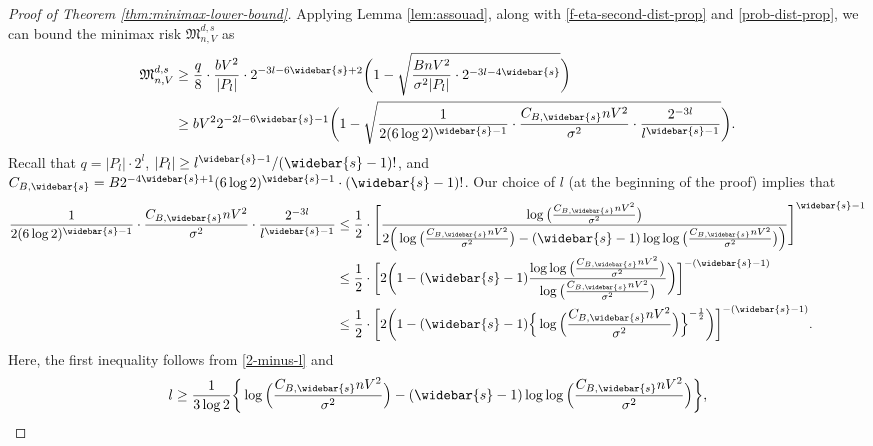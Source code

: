 \documentclass[10pt]{article}
\newcommand{\minimax}{{\mathfrak{M}^{d, s}_{n, V}}}
\begin{document}
\begin{proof}[Proof of Theorem \ref{thm:minimax-lower-bound}]
Applying Lemma \ref{lem:assouad}, along with 
\eqref{f-eta-second-dist-prop} and \eqref{prob-dist-prop}, we can bound 
the minimax risk $\minimax$ as
\begin{equation*}  
\begin{aligned}
    \minimax &\ge \frac{q}{8} \cdot \frac{b V^2}{|P_l|} 
    \cdot 2^{-3l - 6\widebar{s} + 2} 
    \bigg(1 - \sqrt{\frac{B n V^2}{\sigma^2|P_l|} 
    \cdot 2^{-3l - 4\widebar{s}}}\bigg) \\
    &\ge b V^2 2^{-2l - 6\widebar{s} - 1} 
    \bigg(1 - \sqrt{\frac{1}{2(6 \log 2)^{\widebar{s} - 1}} 
    \cdot \frac{C_{B, \widebar{s}} n V^2}{\sigma^2} 
    \cdot \frac{2^{-3l}}{l^{\widebar{s} - 1}}}\bigg).
\end{aligned}
\end{equation*}
Recall that $q = |P_l| \cdot 2^l$, 
$|P_l| \ge l^{\widebar{s}- 1}/(\widebar{s} - 1)!$, and 
$C_{B, \widebar{s}} = B 2^{-4\widebar{s} + 1} 
(6 \log 2)^{\widebar{s} - 1} \cdot (\widebar{s} - 1)!$.
Our choice of $l$ (at the beginning of the proof) implies that
\begin{equation*}
\begin{aligned}
    \frac{1}{2(6 \log 2)^{\widebar{s} - 1}} \cdot 
    \frac{C_{B, \widebar{s}} n V^2}{\sigma^2} 
    \cdot \frac{2^{-3l}}{l^{\widebar{s} - 1}} 
    &\le \frac{1}{2} \cdot \Bigg[\frac{\log\big(
        \frac{C_{B, \widebar{s}} n V^2}{\sigma^2}\big)}
        {2\Big(\log\big(\frac{C_{B, \widebar{s}} n V^2}{\sigma^2}\big) 
        - (\widebar{s} - 1) \log \log \big(\frac{C_{B, \widebar{s}} 
        n V^2}{\sigma^2}\big)\Big)}\Bigg]^{\widebar{s} - 1} \\
    &\le \frac{1}{2} \cdot \bigg[2\bigg(1 - (\widebar{s} - 1) 
    \frac{\log \log\big(\frac{C_{B, \widebar{s}} n V^2}{\sigma^2}\big)}
    {\log \big(\frac{C_{B, \widebar{s}} n V^2}{\sigma^2}\big)}
    \bigg)\bigg]^{-(\widebar{s} - 1)} \\
    &\le \frac{1}{2} \cdot \bigg[2\bigg(1 - (\widebar{s} - 1) 
    \Big\{\log\Big(\frac{C_{B, \widebar{s}} 
    n V^2}{\sigma^2}\Big)\Big\}^{-\frac{1}{2}} 
    \bigg)\bigg]^{-(\widebar{s} - 1)}.
\end{aligned}
\end{equation*}
Here, the first inequality follows from \eqref{2-minus-l} and 
\begin{equation*}
    l \ge \frac{1}{3 \log 2}\bigg\{\log\Big(\frac{C_{B, \widebar{s}} 
    n V^2}{\sigma^2}\Big) 
    - (\widebar{s} - 1) \log \log\Big(\frac{C_{B, \widebar{s}} 
    n V^2}{\sigma^2}\Big)\bigg\},
\end{equation*}

\end{proof}
\end{document}
